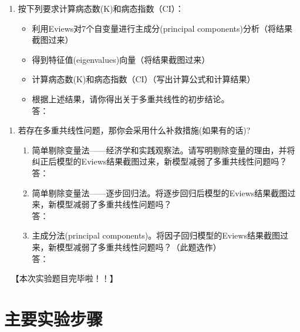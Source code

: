 \documentclass[12pt,(landscape,a4paper),(portrait,a4paper)]{article}
\providecommand{\tightlist}{%
  \setlength{\itemsep}{0pt}\setlength{\parskip}{0pt}}
\let\stdsection\section
\renewcommand\section{\newpage\stdsection}
\begin{document}
\begin{enumerate}
\def\labelenumi{\alph{enumi}.}
\setcounter{enumi}{5}
\tightlist
\item
  按下列要求计算病态数(K)和病态指数（CI）：

  \begin{itemize}
  \tightlist
  \item
    利用Eviews对7个自变量进行主成分(principal
    components)分析（将结果截图过来）
  \item
    得到特征值(eigenvalues)向量（将结果截图过来）
  \item
    计算病态数(K)和病态指数（CI）（写出计算公式和计算结果）
  \item
    根据上述结果，请你得出关于多重共线性的初步结论。\\
    答：\\
  \end{itemize}
\end{enumerate}

\begin{enumerate}
\def\labelenumi{\arabic{enumi}.}
\setcounter{enumi}{2}
\tightlist
\item
  若存在多重共线性问题，那你会采用什么补救措施(如果有的话)?

  \begin{enumerate}
  \def\labelenumii{\alph{enumii}.}
  \tightlist
  \item
    简单剔除变量法------经济学和实践观察法。请写明剔除变量的理由，并将纠正后模型的Eviews结果截图过来，新模型减弱了多重共线性问题吗？\\
    答：\\
  \item
    简单剔除变量法------逐步回归法。将逐步回归后模型的Eviews结果截图过来，新模型减弱了多重共线性问题吗？\\
    答：\\
  \item
    主成分法(principal
    components)。将因子回归模型的Eviews结果截图过来，新模型减弱了多重共线性问题吗？（此题选作）\\
    答：
  \end{enumerate}
\end{enumerate}

~ 【本次实验题目完毕啦！！】

\newpage

\section{主要实验步骤}
\end{document}
